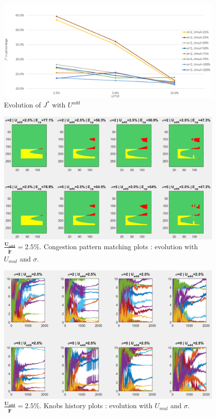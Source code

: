 \begin{figure}[h]
	\label{fig:uadd}
	\caption{Evolution of $J^{*}$ with $U^{add}$}
	\includegraphics[width=7in]{figures/uadd.png}
\end{figure}
\begin{figure}[h]
	\label{fig:uaddcp25}
	\caption{$\mathbf{\frac{U_{add}}{\widetilde{F}}=2.5\%}$. Congestion pattern matching plots : evolution with $U_{mul}$ and $\sigma$.}
	\includegraphics[width=7in]{figures/results_figures/Uadd/cp_Uadd_25_lambda_11.png}
\end{figure}	
\begin{figure}[h]
	\label{fig:uaddknobs25}
	\caption{$\mathbf{\frac{U_{add}}{\widetilde{F}}=2.5\%}$. Knobs history plots : evolution with $U_{mul}$ and $\sigma$.}
	\includegraphics[width=7in]{figures/results_figures/Uadd/knobs_Uadd_25_lambda_11.png}
\end{figure}
